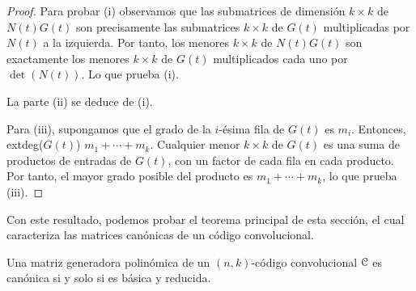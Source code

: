 \begin{proof}
Para probar (i) observamos que las submatrices de dimensión $k \times k$ de $N(t)G(t)$ son precisamente las submatrices $k \times k$ de $G(t)$ multiplicadas por $N(t)$ a la izquierda. Por tanto, los menores $k \times k$ de $N(t)G(t)$ son exactamente los menores $k \times k$ de $G(t)$ multiplicados cada uno por $\det(N(t))$. Lo que prueba (i). 

La parte (ii) se deduce de (i). 

Para (iii), supongamos que el grado de la $i$-ésima fila de $G(t)$ es $m_i$. Entonces, extdeg($G(t)$) $m_1 + \cdots + m_k$. Cualquier menor $k \times k$ de $G(t)$ es una suma de productos de entradas de $G(t)$, con un factor de cada fila en cada producto. Por tanto, el mayor grado posible del producto es  $m_1 + \cdots + m_k$, lo que prueba (iii).  
\end{proof}

Con este resultado, podemos probar el teorema principal de esta sección, el cual caracteriza las matrices canónicas de un código convolucional.

\begin{teorema}
Una matriz generadora polinómica de un $(n,k)$-código convolucional $\mathcal C$ es canónica si y solo si es básica y reducida.
\end{teorema}

